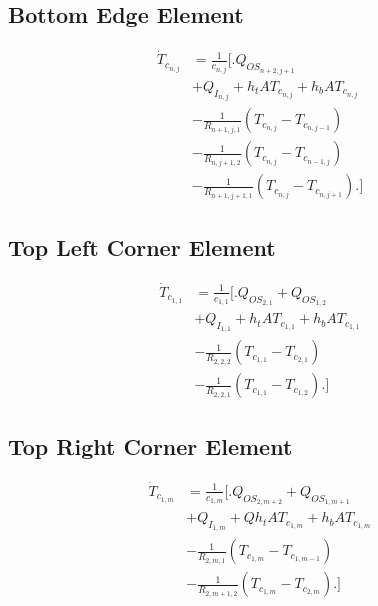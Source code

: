\documentclass[10pt,twocolumn]{article}
\begin{document}
\subsection{Bottom Edge Element}
\begin{equation}
\begin{split}
\dot{T}_{c_{n,j}}	& = \frac{1}{c_{n,j}}
					\Biggl[\Biggr.
					 	   Q_{OS_{n+2,j+1}} \\
					&	 + Q_{I_{n,j}}+ h_{t}AT_{c_{n,j}} + h_{b}AT_{c_{n,j}} \\
					&	- \frac{1}{R_{n+1,j,1}}\left(T_{c_{n,j}}- T_{c_{n,j-1}}\right) \\
					& 	- \frac{1}{R_{n,j+1,2}}\left(T_{c_{n,j}}- T_{c_{n-1,j}}\right) \\
					& 	- \frac{1}{R_{n+1,j+1,1}}\left(T_{c_{n,j}}- T_{c_{n,j+1}}\right)
					\Biggl.\Biggr]
\end{split}
\end{equation}

\subsection{Top Left Corner Element}
\begin{equation}
\begin{split}
\dot{T}_{c_{1,1}}	& = \frac{1}{c_{1,1}}
					\Biggl[\Biggr.
					 	  Q_{OS_{2,1}} + Q_{OS_{1,2}} \\
					& 	+ Q_{I_{1,1}}+ h_{t}AT_{c_{1,1}} + h_{b}AT_{c_{1,1}} \\
					&	- \frac{1}{R_{2,2,2}}\left(T_{c_{1,1}}- T_{c_{2,1}}\right) \\
					& 	- \frac{1}{R_{2,2,1}}\left(T_{c_{1,1}}- T_{c_{1,2}}\right)
					\Biggl.\Biggr]
\end{split}
\end{equation}

\subsection{Top Right Corner Element}
\begin{equation}
\begin{split}
\dot{T}_{c_{1,m}}	& = \frac{1}{c_{1,m}}
					\Biggl[\Biggr.
					 	  Q_{OS_{2,m+2}} + Q_{OS_{1,m+1}} \\
					& 	+ Q_{I_{1,m}}+ Qh_{t}AT_{c_{1,m}} + h_{b}AT_{c_{1,m}} \\
					&	- \frac{1}{R_{2,m,1}}\left(T_{c_{1,m}}- T_{c_{1,m-1}}\right) \\
					& 	- \frac{1}{R_{2,m+1,2}}\left(T_{c_{1,m}}- T_{c_{2,m}}\right)
					\Biggl.\Biggr]
\end{split}
\end{equation}
\end{document}
